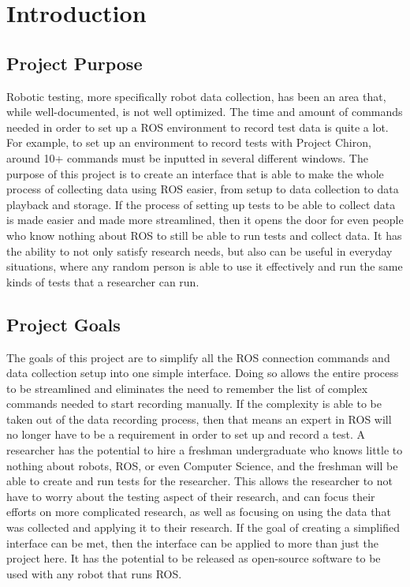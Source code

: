 \documentclass[onecolumn, draftclsnofoot,10pt, compsoc]{IEEEtran}
\begin{document}
\section{Introduction}
\subsection{Project Purpose}
Robotic testing, more specifically robot data collection, has been an area that, while well-documented, is not well optimized. The time and amount of commands needed in order to set up a ROS environment to record test data is quite a lot. For example, to set up an environment to record tests with Project Chiron, around 10+ commands must be inputted in several different windows. The purpose of this project is to create an interface that is able to make the whole process of collecting data using ROS easier, from setup to data collection to data playback and storage. If the process of setting up tests to be able to collect data is made easier and made more streamlined, then it opens the door for even people who know nothing about ROS to still be able to run tests and collect data. It has the ability to not only satisfy research needs, but also can be useful in everyday situations, where any random person is able to use it effectively and run the same kinds of tests that a researcher can run.
\subsection{Project Goals}
The goals of this project are to simplify all the ROS connection commands and data collection setup into one simple interface. Doing so allows the entire process to be streamlined and eliminates the need to remember the list of complex commands needed to start recording manually. If the complexity is able to be taken out of the data recording process, then that means an expert in ROS will no longer have to be a requirement in order to set up and record a test. A researcher has the potential to hire a freshman undergraduate who knows little to nothing about robots, ROS, or even Computer Science, and the freshman will be able to create and run tests for the researcher. This allows the researcher to not have to worry about the testing aspect of their research, and can focus their efforts on more complicated research, as well as focusing on using the data that was collected and applying it to their research. If the goal of creating a simplified interface can be met, then the interface can be applied to more than just the project here. It has the potential to be released as open-source software to be used with any robot that runs ROS.
\end{document}
